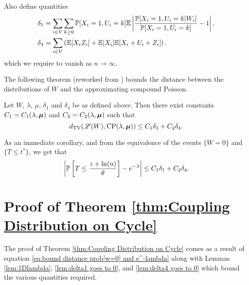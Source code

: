 	Also define quantities
	\begin{align}
		\delta_1 &= \sum_{i \in V}  \sum_{k \geq 0} \mathbb{P}[X_i = 1, U_i = k] \mathbb{E} \left|\frac{\mathbb{P}[X_i = 1, U_i = k|W_i]}{\mathbb{P}[X_i = 1, U_i = k]} - 1 \right|,\\ 
		\delta_4 &= \sum_{i \in V} \left( \mathbb{E}[X_i Z_i] + \mathbb{E}[X_i] \mathbb{E}[X_i + U_i + Z_i] \right).
	\end{align}
	which we require to vanish as $n \rightarrow \infty$.

	The following theorem (reworked from \cite{Barbour2001-nh}) bounds the distance between the distributions of $W$ and the approximating compound Poisson.

	\begin{theorem}
	\label{thm: compound poisson approximation}
		Let $W$, $\lambda$, $\mu$, $\delta_1$ and $\delta_4$ be as defined above. Then there exist constants $C_1 = C_1(\lambda, {\bm{{\mu}}})$ and $C_2 = C_2(\lambda, {\bm{{\mu}}})$ such that
		\begin{equation}
			d_{\mathrm{TV}}(\mathscr{L}(W), \mathrm{CP}(\lambda, {\bm{{\mu}}})) \leq C_1 \delta_1 + C_2 \delta_4.
		\end{equation}
	\end{theorem}
	As an immediate corollary, and from the equivalence of the events $\{W = 0\}$ and $\{T \leq t^*\}$, we get that
	\begin{equation}
		\left|\mathbb{P}\left[T \leq \frac{z+\ln(n)}{\theta}\right] - e^{-\lambda}\right| \leq C_1 \delta_1 + C_2 \delta_4.
		\label{eq:bound distance prob[w=0] and e^-lambda}
	\end{equation}

	\section{Proof of Theorem \ref{thm:Coupling Distribution on Cycle}}
	The proof of Theorem \ref{thm:Coupling Distribution on Cycle} comes as a result of equation \eqref{eq:bound distance prob[w=0] and e^-lambda} along with Lemmas \ref{lem:1Dlambda}, \ref{lem:delta1 goes to 0}, and \ref{lem:delta4 goes to 0} which bound the various quantities required.


